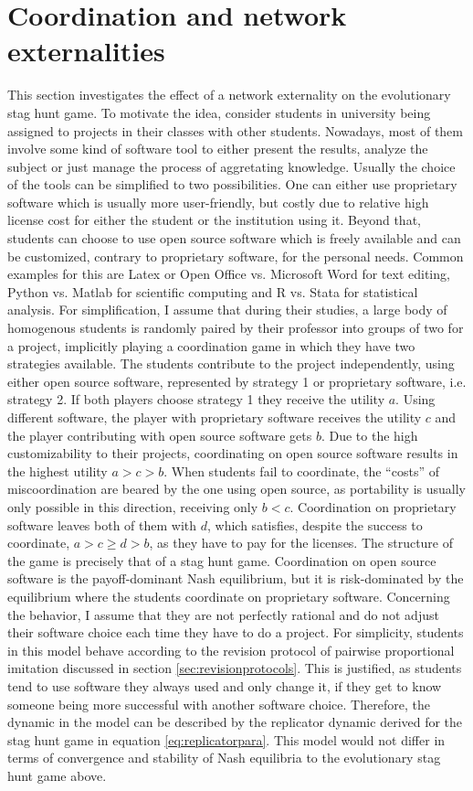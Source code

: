 \documentclass[11pt]{article}
\begin{document}
\section{Coordination and network externalities}
\label{simplemodel}
This section investigates the effect of a network externality on the
evolutionary stag hunt game.
To motivate the idea, consider students in university being assigned to
projects in their classes with other students. Nowadays, most of them 
involve some kind of software tool to either present the results, analyze 
the subject or just manage the process of aggretating 
knowledge. Usually the choice of the tools can be simplified to two 
possibilities. One can either use proprietary software
which is usually more user-friendly, but costly due to relative high 
license cost for either the student or the institution using it. 
Beyond that, students can choose to use open source software which is freely
available and can be customized, contrary to proprietary software,
for the personal needs. Common examples for this are Latex or Open Office
vs. Microsoft Word for text editing, Python vs. Matlab for scientific 
computing and R vs. Stata for statistical analysis.
For simplification, I assume that during their studies, a large body of 
homogenous students is randomly paired by their professor into groups of two 
for a project, implicitly playing a coordination game in which they have two 
strategies available. The students contribute to the project 
independently, using either open source software, 
represented by strategy 1 or proprietary software, i.e. strategy 2.
If both players choose strategy 1 they receive 
the utility $a$. Using different software, the player with 
proprietary software receives the utility $c$ and
the player contributing with open source software gets $b$.
Due to the high customizability to their projects, coordinating on open
source software results in the highest utility $a>c>b$.
When students fail to coordinate, the ``costs'' of miscoordination are beared
by the one using open source, as portability is usually only possible in 
this direction, receiving only $b<c$.
Coordination on proprietary software leaves both of them with $d$, which 
satisfies, despite the success to coordinate, $a> c\geq d>b$, as they have to
pay for the licenses. 
The structure of the game is precisely that of a stag hunt game. 
Coordination on open source software is the payoff-dominant Nash equilibrium,
but it is risk-dominated by the equilibrium where the students coordinate on
proprietary software. 
Concerning the behavior, I assume that they are not perfectly rational and
do not adjust their software choice each time they have to do a project.
For simplicity, students in this model behave according to the 
revision protocol of pairwise proportional imitation discussed in section 
\ref{sec:revisionprotocols}. 
This is justified, as students tend to use software they always used and 
only change it, if they get to know someone being more successful with
another software choice. Therefore, the dynamic in the model can be 
described by the replicator dynamic derived for the stag hunt game in 
equation \eqref{eq:replicatorpara}.
This model would not differ in terms of convergence and stability of Nash 
equilibria to the evolutionary stag hunt game above.
\end{document}
